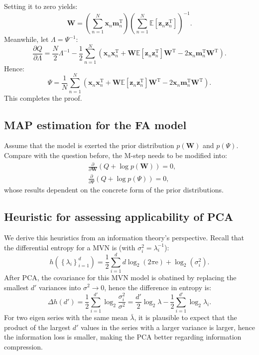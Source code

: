 \documentclass[UTF8]{ctexart}
\begin{document}
Setting it to zero yields:
$$\textbf{W}=\left(\sum_{n=1}^{N}\textbf{x}_{n}\textbf{m}_{n}^{\text{T}}\right)\left(\sum_{n=1}^{N}\mathbb{E}[\textbf{z}_{n}\textbf{z}_{n}^{\text{T}}] \right)^{-1}.$$
Meanwhile, let $\Lambda=\Psi^{-1}$:
$$
\frac{\partial Q}{\partial \Lambda}=\frac{N}{2}\Lambda^{-1}-\frac{1}{2}\sum_{n=1}^{N}\left(\textbf{x}_{n}\textbf{x}_{n}^{\text{T}}+\textbf{W}\mathbb{E}[\textbf{z}_{n}\textbf{z}_{n}^{\text{T}}]\textbf{W}^{\text{T}}-2\textbf{x}_{n}\textbf{m}_{n}^{\text{T}}\textbf{W}^{\text{T}}\right).
$$
Hence:
$$\Psi=\frac{1}{N}\sum_{n=1}^{N}\left(\textbf{x}_{n}\textbf{x}_{n}^{\text{T}}+\textbf{W}\mathbb{E}[\textbf{z}_{n}\textbf{z}_{n}^{\text{T}}]\textbf{W}^{\text{T}}-2\textbf{x}_{n}\textbf{m}_{n}^{\text{T}}\textbf{W}^{\text{T}}\right).$$
This completes the proof.


\subsection{MAP estimation for the FA model}
Assume that the model is exerted the prior distribution $p(\textbf{W})$ and $p(\Psi)$. 
Compare with the question before, the M-step needs to be modified into:
$$
\begin{aligned}
&\frac{\partial}{\partial \textbf{W}}(Q+\log p(\textbf{W}))=0,\\
&\frac{\partial}{\partial \Psi}(Q+\log p(\Psi))=0,
\end{aligned}
$$
whose results dependent on the concrete form of the prior distributions. 

\subsection{Heuristic for assessing applicability of PCA}
We derive this heuristics from an information theory's perspective.
Recall that the differential entropy for a MVN is (with $\sigma_{i}^{2}=\lambda_{i}^{-1}$):
$$h(\left\{\lambda_{i} \right\}_{i=1}^{d})=\frac{1}{2}\sum_{i=1}^{d}d\log_{2}(2\pi\text{e})+\log_{2}(\sigma_{i}^{2}).$$
After PCA, the covariance for this MVN model is obatined by replacing the smallest $d'$ variances into $\sigma^{2}\rightarrow 0$, hence the difference in entropy is:
$$\Delta h(d')=\frac{1}{2}\sum_{i=1}^{d'}\log_{2}\frac{\sigma^{2}_{i}}{\sigma^{2}}=\frac{d'}{2}\log_{2}\lambda-\frac{1}{2}\sum_{i=1}^{d'}\log_{2}\lambda_{i}.$$
For two eigen series with the same mean $\bar{\lambda}$, it is plausible to expect that the product of the largest $d'$ values in the series with a larger variance is larger, hence the information loss is smaller, making the PCA better regarding information compression. 
\end{document}
